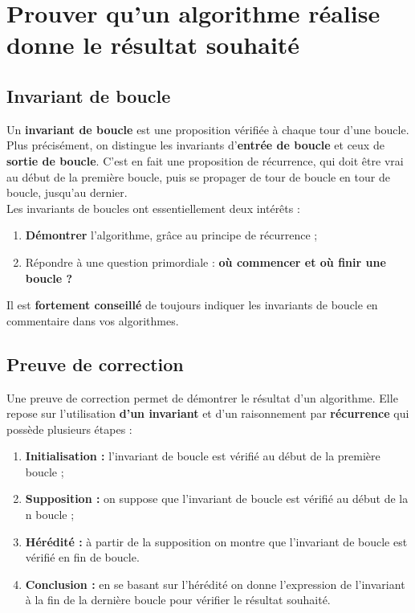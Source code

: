 \section{Prouver qu'un algorithme réalise donne le résultat souhaité}

\subsection{Invariant de boucle}

\begin{defi}
Un \textbf{invariant de boucle} est une proposition vérifiée à chaque tour d'une boucle. Plus 
précisément, on distingue les invariants d'\textbf{entrée de boucle} et ceux de \textbf{sortie de 
boucle}. C'est en fait une proposition de récurrence, qui doit être vrai au début de la première 
boucle, puis se propager de tour de boucle en tour de boucle, jusqu'au dernier.\\
Les invariants de boucles ont essentiellement deux intérêts :
\begin{enumerate}
 \item \textbf{Démontrer} l'algorithme, grâce au principe de récurrence ;
 \item Répondre à une question primordiale : \textbf{où commencer et où finir une boucle ?}
\end{enumerate}
\end{defi}

\begin{rem}
Il est \textbf{fortement conseillé} de toujours indiquer les invariants de boucle en commentaire 
dans vos algorithmes.\\ 
\end{rem}



\subsection{Preuve de correction}

\begin{defi}
Une preuve de correction permet de démontrer le résultat d'un algorithme. Elle repose sur l'utilisation \textbf{d'un invariant} et d'un raisonnement par \textbf{récurrence} qui possède plusieurs étapes : 

\begin{enumerate}
\item \textbf{Initialisation : } l'invariant de boucle est vérifié au début de la première boucle ;
\item \textbf{Supposition : } on suppose que l'invariant de boucle est vérifié au début de la n boucle ;
\item \textbf{Hérédité : } à partir de la supposition on montre que l'invariant de boucle est vérifié en fin de boucle.
\item \textbf{Conclusion : } en se basant sur l'hérédité on donne l'expression de l'invariant à la fin de la dernière boucle pour vérifier le résultat souhaité.
\end{enumerate}

\end{defi}

